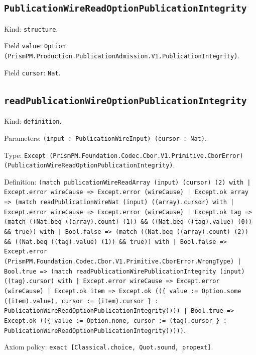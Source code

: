 \documentclass[11pt]{article}
\begin{document}
\subsection*{\texttt{PublicationWireReadOptionPublicationIntegrity}}
\noindent Kind: \texttt{structure}.\par
\noindent Field \texttt{value}: \texttt{Option (PrismPM.Production.PublicationAdmission.V1.PublicationIntegrity)}.\par
\noindent Field \texttt{cursor}: \texttt{Nat}.\par
\subsection*{\texttt{readPublicationWireOptionPublicationIntegrity}}
\noindent Kind: \texttt{definition}.\par
\noindent Parameters: \texttt{(input : PublicationWireInput) (cursor : Nat)}.\par
\noindent Type: \texttt{Except (PrismPM.Foundation.Codec.Cbor.V1.Primitive.CborError) (PublicationWireReadOptionPublicationIntegrity)}.\par
\noindent Definition: \texttt{(match publicationWireReadArray (input) (cursor) (2) with | Except.error wireCause => Except.error (wireCause) | Except.ok array => (match readPublicationWireNat (input) ((array).cursor) with | Except.error wireCause => Except.error (wireCause) | Except.ok tag => (match ((Nat.beq ((array).count) (1)) \&\& ((Nat.beq ((tag).value) (0)) \&\& true)) with | Bool.false => (match ((Nat.beq ((array).count) (2)) \&\& ((Nat.beq ((tag).value) (1)) \&\& true)) with | Bool.false => Except.error (PrismPM.Foundation.Codec.Cbor.V1.Primitive.CborError.WrongType) | Bool.true => (match readPublicationWirePublicationIntegrity (input) ((tag).cursor) with | Except.error wireCause => Except.error (wireCause) | Except.ok item => Except.ok ((\{ value := Option.some ((item).value), cursor := (item).cursor \} : PublicationWireReadOptionPublicationIntegrity)))) | Bool.true => Except.ok ((\{ value := Option.none, cursor := (tag).cursor \} : PublicationWireReadOptionPublicationIntegrity)))))}.\par
\noindent Axiom policy: \texttt{exact [Classical.choice, Quot.sound, propext]}.\par
\end{document}
